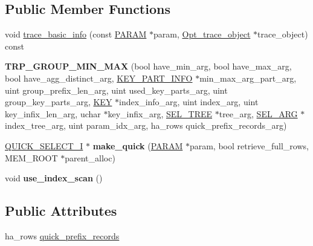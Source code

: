 \subsection*{Public Member Functions}
\begin{DoxyCompactItemize}
\item 
void \mbox{\hyperlink{classTRP__GROUP__MIN__MAX_aeff4d1a82cdb7f15f61d34191971967f}{trace\+\_\+basic\+\_\+info}} (const \mbox{\hyperlink{classPARAM}{P\+A\+R\+AM}} $\ast$param, \mbox{\hyperlink{classOpt__trace__object}{Opt\+\_\+trace\+\_\+object}} $\ast$trace\+\_\+object) const
\item 
\mbox{\label{classTRP__GROUP__MIN__MAX_a5c0542b88236d578de11cab4eaa2c639}} 
{\bfseries T\+R\+P\+\_\+\+G\+R\+O\+U\+P\+\_\+\+M\+I\+N\+\_\+\+M\+AX} (bool have\+\_\+min\+\_\+arg, bool have\+\_\+max\+\_\+arg, bool have\+\_\+agg\+\_\+distinct\+\_\+arg, \mbox{\hyperlink{classKEY__PART__INFO}{K\+E\+Y\+\_\+\+P\+A\+R\+T\+\_\+\+I\+N\+FO}} $\ast$min\+\_\+max\+\_\+arg\+\_\+part\+\_\+arg, uint group\+\_\+prefix\+\_\+len\+\_\+arg, uint used\+\_\+key\+\_\+parts\+\_\+arg, uint group\+\_\+key\+\_\+parts\+\_\+arg, \mbox{\hyperlink{structst__key}{K\+EY}} $\ast$index\+\_\+info\+\_\+arg, uint index\+\_\+arg, uint key\+\_\+infix\+\_\+len\+\_\+arg, uchar $\ast$key\+\_\+infix\+\_\+arg, \mbox{\hyperlink{classSEL__TREE}{S\+E\+L\+\_\+\+T\+R\+EE}} $\ast$tree\+\_\+arg, \mbox{\hyperlink{classSEL__ARG}{S\+E\+L\+\_\+\+A\+RG}} $\ast$index\+\_\+tree\+\_\+arg, uint param\+\_\+idx\+\_\+arg, ha\+\_\+rows quick\+\_\+prefix\+\_\+records\+\_\+arg)
\item 
\mbox{\label{classTRP__GROUP__MIN__MAX_a35b0784ebf76bdd68b6d6f21c79eef83}} 
\mbox{\hyperlink{classQUICK__SELECT__I}{Q\+U\+I\+C\+K\+\_\+\+S\+E\+L\+E\+C\+T\+\_\+I}} $\ast$ {\bfseries make\+\_\+quick} (\mbox{\hyperlink{classPARAM}{P\+A\+R\+AM}} $\ast$param, bool retrieve\+\_\+full\+\_\+rows, M\+E\+M\+\_\+\+R\+O\+OT $\ast$parent\+\_\+alloc)
\item 
\mbox{\label{classTRP__GROUP__MIN__MAX_aeff0b40c5929ce8ac4396a94c20b8b08}} 
void {\bfseries use\+\_\+index\+\_\+scan} ()
\end{DoxyCompactItemize}
\subsection*{Public Attributes}
\begin{DoxyCompactItemize}
\item 
ha\+\_\+rows \mbox{\hyperlink{classTRP__GROUP__MIN__MAX_a7747b5e8ae35e3b05fbbd5aa5b3979fb}{quick\+\_\+prefix\+\_\+records}}
\end{DoxyCompactItemize}
